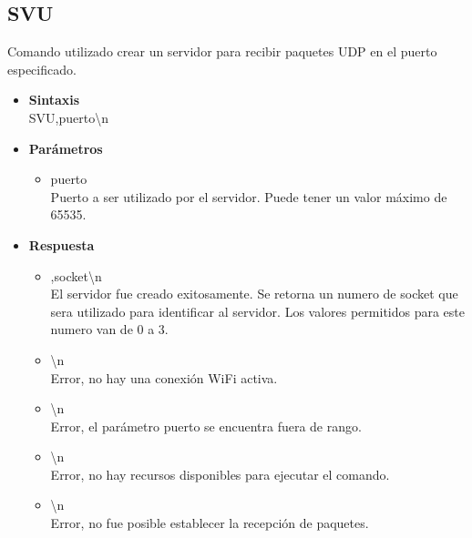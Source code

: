 \documentclass[a4paper,spanish]{article}
\begin{document}
\subsection{SVU}
Comando utilizado crear un servidor para recibir paquetes UDP en el puerto especificado.   
\begin{itemize}
	\item \textbf{Sintaxis}\\
	{\ttfamily SVU,puerto\textbackslash n}
	\item \textbf{Parámetros}
	\begin{itemize}
		\item{\ttfamily puerto}\\
		Puerto a ser utilizado por el servidor. Puede tener un valor máximo de 65535. 
	\end{itemize}
	\item \textbf{Respuesta}
	\begin{itemize}
		\item{,socket\textbackslash n} \\
		El servidor fue creado exitosamente. Se retorna un numero de {\ttfamily socket} que sera utilizado para identificar al servidor. Los valores permitidos para este numero van de 0 a 3.
		\item{\textbackslash n} \\
		Error, no hay una conexión WiFi activa.
		\item{\textbackslash n} \\
		Error, el parámetro {\ttfamily puerto} se encuentra fuera de rango.
		\item{\textbackslash n} \\
		Error, no hay recursos disponibles para ejecutar el comando.
		\item{\textbackslash n} \\
		Error, no fue posible establecer la recepción de paquetes.
	\end{itemize}
\end{itemize}
\end{document}
